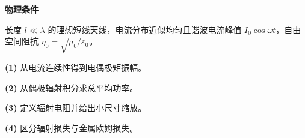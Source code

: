 \textbf{物理条件}\par 长度 \(l\ll\lambda\) 的理想短线天线，电流分布近似均匀且谐波电流峰值 \(I_0\cos\omega t\)，自由空间阻抗 \(\eta_0=\sqrt{\mu_0/\varepsilon_0}\)。
\par\noindent\textbf{(1)} 从电流连续性得到电偶极矩振幅。
\par\noindent\textbf{(2)} 从偶极辐射积分求总平均功率。
\par\noindent\textbf{(3)} 定义辐射电阻并给出小尺寸缩放。
\par\noindent\textbf{(4)} 区分辐射损失与金属欧姆损失。
